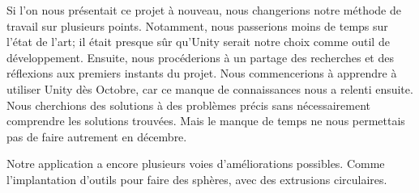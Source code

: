 \documentclass[a4paper,11pt]{article}
\begin{document}
			Si l'on nous présentait ce projet à nouveau, nous changerions notre méthode de travail sur plusieurs points. Notamment, nous passerions moins de temps sur l'état de l'art; il était presque sûr qu'Unity serait notre choix comme outil de développement. Ensuite, nous procéderions à un partage des recherches et des réflexions aux premiers instants du projet. Nous commencerions à apprendre à utiliser Unity dès Octobre, car ce manque de connaissances nous a relenti ensuite. Nous cherchions des solutions à des problèmes précis sans nécessairement comprendre les solutions trouvées. Mais le manque de temps ne nous permettais pas de faire autrement en décembre. %
			
			Notre application a encore plusieurs voies d'améliorations possibles. Comme l'implantation d'outils pour faire des sphères, avec des extrusions circulaires.
	
\end{document}
